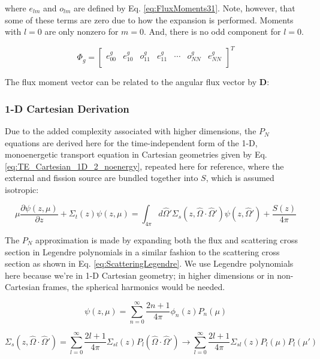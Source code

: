 \documentclass[10pt]{article}
\newcommand{\hO}{\hat{\Omega}}
\begin{document}
\begin{flushleft}
where \(e_{lm}\) and \(o_{lm}\) are defined by Eq. \eqref{eq:FluxMoments31}. Note, however, that some of these terms are zero due to how the expansion is performed. Moments with \(l=0\) are only nonzero for \(m=0\). And, there is no odd component for \(l=0\). 

\begin{equation}
\Phi_g=\begin{bmatrix}
e_{00}^g & e_{10}^g & o_{11}^g & e_{11}^g & \cdots & o_{NN}^g & e_{NN}^g\\
\end{bmatrix}^T
\end{equation}

The flux moment vector can be related to the angular flux vector by \(\textbf{D}\):

\clearpage


\clearpage
 
\subsubsection{1-D Cartesian Derivation}

Due to the added complexity associated with higher dimensions, the \(P_N\) equations are derived here for the time-independent form of the 1-D, monoenergetic transport equation in Cartesian geometries given by Eq. \eqref{eq:TE_Cartesian_1D_2_noenergy}, repeated here for reference, where the external and fission source are bundled together into \(S\), which is assumed isotropic:

\begin{equation*}
\mu \frac{\partial \psi(z, \mu)}{\partial z} +
 \Sigma_t(z)\psi(z, \mu) =\int_{4\pi}^{} d\hO  ' \Sigma_s(z, \hO  \cdot\hO  ')\psi(z,\hO  ') + \frac{S(z)}{4\pi}
 \end{equation*}

The \(P_N\) approximation is made by expanding both the flux and scattering cross section in Legendre polynomials in a similar fashion to the scattering cross section as shown in Eq. \eqref{eq:ScatteringLegendre}. We use Legendre polynomials here because we're in 1-D Cartesian geometry; in higher dimensions or in non-Cartesian frames, the spherical harmonics would be needed.

\begin{equation}
\label{eq:AngularFluxPN}
\psi(z,\mu)=\sum_{n=0}^{\infty}\frac{2n+1}{4\pi}\phi_n(z)P_n(\mu)
\end{equation}

\begin{equation}
\label{eq:PNScatteringCrossSectionExpansion}
\Sigma_s(z,\hO  \cdot\hO  ')=\sum_{l=0}^{\infty}\frac{2l+1}{4\pi}\Sigma_{sl}(z)P_l(\hO  \cdot\hO  ')\rightarrow\sum_{l=0}^{\infty}\frac{2l+1}{4\pi}\Sigma_{sl}(z)P_l(\mu)P_l(\mu')
\end{equation}


\end{flushleft}
\end{document}
